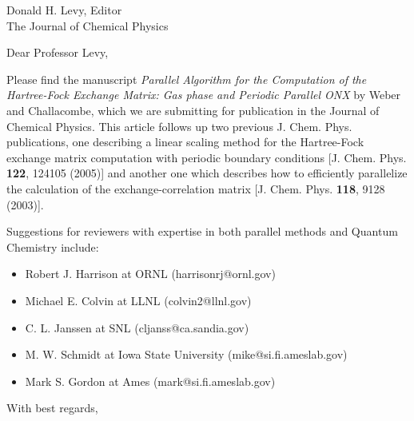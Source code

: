 
\pagestyle{empty}

\signature{V. Weber}

\address{
V. Weber \\
(valeryw@lanl.gov) \\
Theoretical Division \\
Group T-12, MS B268 \\
Los Alamos National Laboratory \\
Los Alamos, NM 87545 }

\date{February 6, 2006}

\begin{letter}{
    Donald H. Levy, Editor \\
    The Journal of Chemical Physics \\
}

\opening{Dear Professor Levy,}

Please find the manuscript {\em Parallel Algorithm for the Computation of 
the Hartree-Fock Exchange Matrix: Gas phase and Periodic Parallel ONX} 
by Weber and Challacombe, which we are 
submitting for publication in the Journal of Chemical Physics. 
This article follows up two previous J. Chem. Phys. publications, 
one describing a linear scaling method for
the Hartree-Fock exchange matrix computation with periodic boundary 
conditions [J. Chem. Phys. {\bf 122}, 124105 (2005)] and
another one which describes how to efficiently parallelize the calculation
of the exchange-correlation matrix [J. Chem. Phys. {\bf 118}, 9128 (2003)].

Suggestions for reviewers with expertise in both parallel methods and Quantum
Chemistry include:
\begin{itemize}
\item Robert J. Harrison at ORNL (harrisonrj@ornl.gov)
\item Michael E. Colvin at LLNL (colvin2@llnl.gov)
\item C. L. Janssen at SNL (cljanss@ca.sandia.gov)
\item M. W. Schmidt at Iowa State University (mike@si.fi.ameslab.gov)
\item Mark S. Gordon at Ames (mark@si.fi.ameslab.gov)
\end{itemize}

\closing{With best regards,}
\end{letter}

